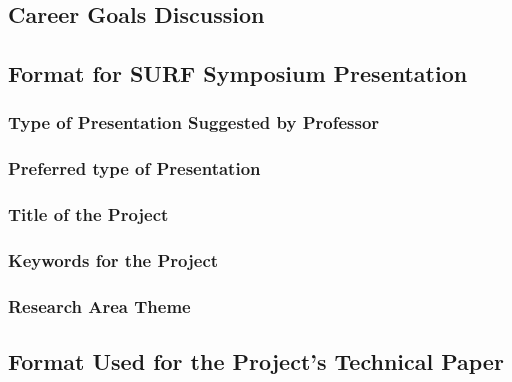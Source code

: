 \documentclass[a4paper]{journal}
\begin{document}
\subsection{Career Goals Discussion}
\subsection{Format for SURF Symposium Presentation}
\subsubsection{Type of Presentation Suggested by Professor}
\subsubsection{Preferred type of Presentation}
\subsubsection{Title of the Project}
\subsubsection{Keywords for the Project}
\subsubsection{Research Area Theme}
\subsection{Format Used for the Project's Technical Paper}
\end{document}
